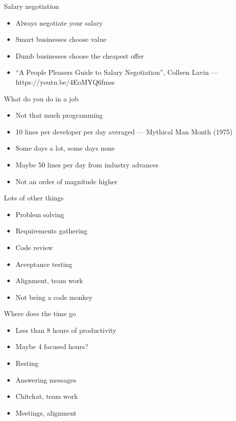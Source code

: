 \documentclass{beamer}
\begin{document}
\begin{frame}{Salary negotiation}
\begin{itemize}
\item Always negotiate your salary
\item Smart businesses choose value
\item Dumb businesses choose the cheapest offer
\item ``A People Pleasers Guide to Salary Negotiation'', Colleen Lavin --- https://youtu.be/4EoMYQ6fmss
\end{itemize}
\end{frame}

\begin{frame}{What do you do in a job}
\begin{itemize}
\item Not that much programming
\item 10 lines per developer per day averaged --- Mythical Man Month (1975)
\item Some days a lot, some days none
\item Maybe 50 lines per day from industry advances
\item Not an order of magnitude higher
\end{itemize}
\end{frame}

\begin{frame}{Lots of other things}
\begin{itemize}
\item Problem solving
\item Requirements gathering
\item Code review
\item Acceptance testing
\item Alignment, team work
\item Not being a code monkey
\end{itemize}
\end{frame}

\begin{frame}{Where does the time go}
\begin{itemize}
\item Less than 8 hours of productivity
\item Maybe 4 focused hours?
\item Resting
\item Answering messages
\item Chitchat, team work
\item Meetings, alignment
\end{itemize}
\end{frame}
\end{document}
